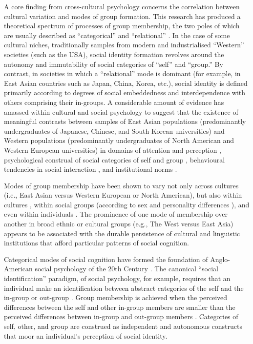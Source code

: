 \begin{CJK}{UTF8}{gbsn}
A core finding from cross-cultural psychology concerns the correlation between cultural variation and modes of group formation.  This research has produced a theoretical spectrum of processes of group membership, the two poles of which are usually described as ``categorical'' and ``relational'' \citep{Hofstede1980,Brewer2007}.  In the case of some cultural niches, traditionally samples from modern and industrialised ``Western'' societies (such as the USA), social identity formation revolves around the autonomy and immutability of social categories of ``self'' and ``group.''  By contrast, in societies in which a ``relational'' mode is dominant (for example, in East Asian countries such as Japan, China, Korea, etc.), social identity is defined primarily according to degrees of social embeddedness and interdependence with others comprising their in-groups\citep{Leung2012}.  A considerable amount of evidence has amassed within cultural and social psychology to suggest that the existence of meaningful contrasts between samples of East Asian populations (predominantly undergraduates of Japanese, Chinese, and South Korean universities) and Western populations (predominantly undergraduates of North American and Western European universities) in domains of attention and perception \citep{Peng1997,Nisbett2003}, psychological construal of social categories of self and group \citep{Markus1991}, behavioural tendencies in social interaction \citep{Yuki2003}, and institutional norms \citep{Liu2017}.

Modes of group membership have been shown to vary not only across cultures (i.e., East Asian versus Western European or North American), but also within cultures \citep{Henrich2014}, within social groups (according to sex and personality differences \citep{Yuki2014}), and even within individuals \citep[depending on contextual and situational primes, see][]{Lee2014,Wong2005}.  The prominence of one mode of membership over another in broad ethnic or cultural groups (e.g., The West versus East Asia) appears to be associated with the durable persistence of cultural and linguistic institutions that afford particular patterns of social cognition.

Categorical modes of social cognition have formed the foundation of Anglo-American social psychology of the 20th Century \citep{Liu2005}.  The canonical ``social identification'' paradigm, of social psychology, for example, requires that an individual make an identification between abstract categories of the self and the in-group or out-group \citep{Turner1987}.  Group membership is achieved when the perceived differences between the self and other in-group members are smaller than the perceived differences between in-group and out-group members \citep{Yuki2014}. Categories of self, other, and group are construed as independent and autonomous constructs that moor an individual's perception of social identity.


\end{CJK}
